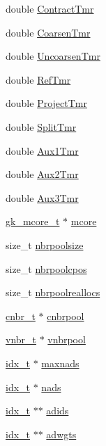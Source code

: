 \begin{DoxyCompactItemize}
\item 
double \hyperlink{a00742_ad256bb292e7bddb9e02afc32ec54aefd}{Contract\+Tmr}
\item 
double \hyperlink{a00742_a0a761fa32d40dad05f3f010480221577}{Coarsen\+Tmr}
\item 
double \hyperlink{a00742_a37132c6afaaed4a8f869d309ba33d1ac}{Uncoarsen\+Tmr}
\item 
double \hyperlink{a00742_a889ffd7d4bb83fcba2ed78141fadb164}{Ref\+Tmr}
\item 
double \hyperlink{a00742_a5261c7a1d0f02a8d39885ed88c34cfe6}{Project\+Tmr}
\item 
double \hyperlink{a00742_a498dff4e4f63117846960426fd44652a}{Split\+Tmr}
\item 
double \hyperlink{a00742_a8e5e7e5e6e0a2d3585180a1724ef46dc}{Aux1\+Tmr}
\item 
double \hyperlink{a00742_a280b66beb62416ce1ba7149b1fdddf34}{Aux2\+Tmr}
\item 
double \hyperlink{a00742_aef8dd3a941d8b0feea5959383a710bf5}{Aux3\+Tmr}
\item 
\hyperlink{a00682}{gk\+\_\+mcore\+\_\+t} $\ast$ \hyperlink{a00742_aa46cd6966a7472f31f8463b6ca99ec52}{mcore}
\item 
size\+\_\+t \hyperlink{a00742_ae37af5d894dbeea35f735361503e58a9}{nbrpoolsize}
\item 
size\+\_\+t \hyperlink{a00742_acafe4ebea8585403e053dc33e7b4ac64}{nbrpoolcpos}
\item 
size\+\_\+t \hyperlink{a00742_a091baa9be72262dca61c641d1f1e4ad3}{nbrpoolreallocs}
\item 
\hyperlink{a00714}{cnbr\+\_\+t} $\ast$ \hyperlink{a00742_a87565a0a2d55cb5595a1a9fa4d66d7c2}{cnbrpool}
\item 
\hyperlink{a00722}{vnbr\+\_\+t} $\ast$ \hyperlink{a00742_a1f7258a6dc2780d0f8224293ecff26b7}{vnbrpool}
\item 
\hyperlink{a00876_aaa5262be3e700770163401acb0150f52}{idx\+\_\+t} $\ast$ \hyperlink{a00742_ac4f8f5cda17ac6d950c61ba575af566c}{maxnads}
\item 
\hyperlink{a00876_aaa5262be3e700770163401acb0150f52}{idx\+\_\+t} $\ast$ \hyperlink{a00742_a47541c8142aba246ca9b7b003100e9d8}{nads}
\item 
\hyperlink{a00876_aaa5262be3e700770163401acb0150f52}{idx\+\_\+t} $\ast$$\ast$ \hyperlink{a00742_a483d832bdceddc91d7a727ca32d35a8f}{adids}
\item 
\hyperlink{a00876_aaa5262be3e700770163401acb0150f52}{idx\+\_\+t} $\ast$$\ast$ \hyperlink{a00742_a7c457a43ad89aaf416e79416ca63d779}{adwgts}

\end{DoxyCompactItemize}
